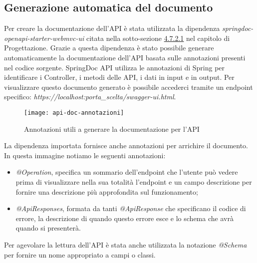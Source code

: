 \subsection{Generazione automatica del documento}
Per creare la documentazione dell'API è stata utilizzata la dipendenza \textit{springdoc-openapi-starter-webmvc-ui} citata nella sotto-sezione \hyperlink{doc-api}{4.7.2.1} nel capitolo di Progettazione. Grazie a questa dipendenza è stato possibile generare automaticamente la documentazione dell'API basata sulle annotazioni presenti nel codice sorgente. SpringDoc API utilizza le annotazioni di Spring per identificare i Controller, i metodi delle API, i dati in input e in output. Per visualizzare questo documento generato è possibile accederci tramite un endpoint specifico: \textit{https://localhost:porta\_scelta/swagger-ui.html}.
\begin{figure}[H] 
    \centering 
    \texttt{[image: api-doc-annotazioni]} 
    \caption{Annotazioni utili a generare la documentazione per l'API}
\end{figure}
\noindent La dipendenza importata fornisce anche annotazioni per arrichire il documento. In questa immagine notiamo le seguenti annotazioni:
\begin{itemize}
\item \textit{@Operation}, specifica un sommario dell'endpoint che l'utente può vedere prima di visualizzare nella sua totalità l'endpoint e un campo descrizione per fornire una descrizione più approfondita sul funzionamento;
\item \textit{@ApiResponses}, formata da tanti \textit{@ApiResponse} che specificano il codice di errore, la descrizione di quando questo errore esce e lo schema che avrà quando si presenterà.
\end{itemize}
Per agevolare la lettura dell'API è stata anche utilizzata la notazione \textit{@Schema} per fornire un nome appropriato a campi o classi.






